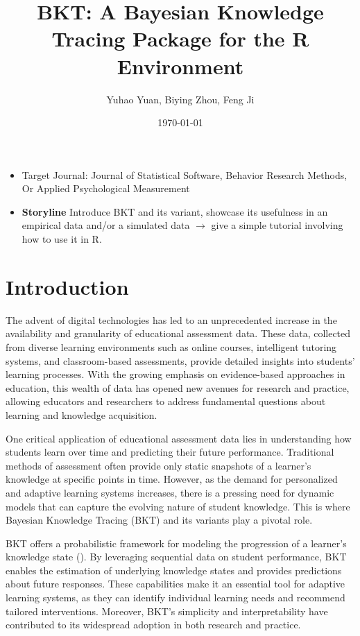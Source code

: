 \documentclass{article}
\title{BKT: A Bayesian Knowledge Tracing Package for the R Environment}
\author{Yuhao Yuan, Biying Zhou, Feng Ji}
\date{\today}
\begin{document}
\maketitle

\begin{itemize}
    \item Target Journal: Journal of Statistical Software, Behavior Research Methods, Or Applied Psychological Measurement
    \item \textbf{Storyline} Introduce BKT and its variant, showcase its usefulness in an empirical data and/or a simulated data $\rightarrow$ give a simple tutorial involving how to use it in R.
\end{itemize}
\section{Introduction}

The advent of digital technologies has led to an unprecedented increase in the availability and granularity of educational assessment data. These data, collected from diverse learning environments such as online courses, intelligent tutoring systems, and classroom-based assessments, provide detailed insights into students' learning processes. With the growing emphasis on evidence-based approaches in education, this wealth of data has opened new avenues for research and practice, allowing educators and researchers to address fundamental questions about learning and knowledge acquisition.

One critical application of educational assessment data lies in understanding how students learn over time and predicting their future performance. Traditional methods of assessment often provide only static snapshots of a learner's knowledge at specific points in time. However, as the demand for personalized and adaptive learning systems increases, there is a pressing need for dynamic models that can capture the evolving nature of student knowledge. This is where Bayesian Knowledge Tracing (BKT) and its variants play a pivotal role.

BKT offers a probabilistic framework for modeling the progression of a learner's knowledge state (\cite{corbett1994knowledge}). By leveraging sequential data on student performance, BKT enables the estimation of underlying knowledge states and provides predictions about future responses. These capabilities make it an essential tool for adaptive learning systems, as they can identify individual learning needs and recommend tailored interventions. Moreover, BKT's simplicity and interpretability have contributed to its widespread adoption in both research and practice.
\end{document}
